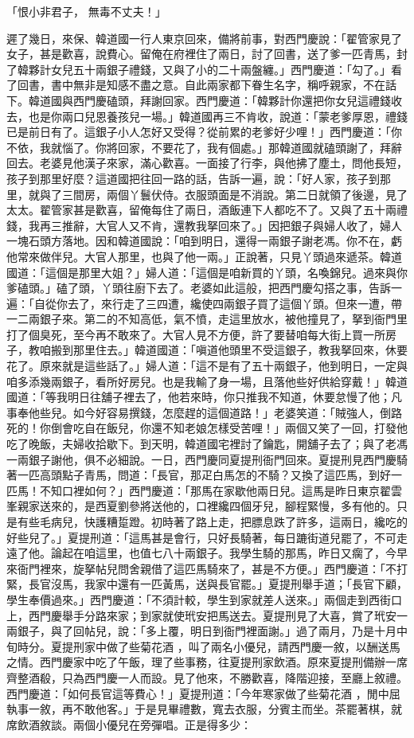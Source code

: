 \begin{showcontents}{}
「恨小非君子，  無毒不丈夫！」

遲了幾日，來保、韓道國一行人東京回來，備將前事，對西門慶說：「翟管家見了女子，甚是歡喜，說費心。留俺在府裡住了兩日，討了回書，送了爹一匹青馬，封了韓夥計女兒五十兩銀子禮錢，又與了小的二十兩盤纏。」西門慶道：「勾了。」看了回書，書中無非是知感不盡之意。自此兩家都下眷生名字，稱呼親家，不在話下。韓道國與西門慶磕頭，拜謝回家。西門慶道：「韓夥計你還把你女兒這禮錢收去，也是你兩口兒恩養孩兒一場。」韓道國再三不肯收，說道：「蒙老爹厚恩，禮錢已是前日有了。這銀子小人怎好又受得？從前累的老爹好少哩！」西門慶道：「你不依，我就惱了。你將回家，不要花了，我有個處。」那韓道國就磕頭謝了，拜辭回去。老婆見他漢子來家，滿心歡喜。一面接了行李，與他拂了塵土，問他長短，孩子到那里好麼？這道國把往回一路的話，告訴一遍，說：「好人家，孩子到那里，就與了三間房，兩個丫鬟伏侍。衣服頭面是不消說。第二日就領了後邊，見了太太。翟管家甚是歡喜，留俺每住了兩日，酒飯連下人都吃不了。又與了五十兩禮錢，我再三推辭，大官人又不肯，還教我拏回來了。」因把銀子與婦人收了，婦人一塊石頭方落地。因和韓道國說：「咱到明日，還得一兩銀子謝老馮。你不在，虧他常來做伴兒。大官人那里，也與了他一兩。」正說著，只見丫頭過來遞茶。韓道國道：「這個是那里大姐？」婦人道：「這個是咱新買的丫頭，名喚錦兒。過來與你爹磕頭。」磕了頭，丫頭往廚下去了。老婆如此這般，把西門慶勾搭之事，告訴一遍：「自從你去了，來行走了三四遭，纔使四兩銀子買了這個丫頭。但來一遭，帶一二兩銀子來。第二的不知高低，氣不憤，走這里放水，被他撞見了，拏到衙門里打了個臭死，至今再不敢來了。大官人見不方便，許了要替咱每大街上買一所房子，教咱搬到那里住去。」韓道國道：「嗔道他頭里不受這銀子，教我拏回來，休要花了。原來就是這些話了。」婦人道：「這不是有了五十兩銀子，他到明日，一定與咱多添幾兩銀子，看所好房兒。也是我輸了身一場，且落他些好供給穿戴！」韓道國道：「等我明日往舖子裡去了，他若來時，你只推我不知道，休要怠慢了他；凡事奉他些兒。如今好容易撰錢，怎麼趕的這個道路！」老婆笑道：「賊強人，倒路死的！你倒會吃自在飯兒，你還不知老娘怎樣受苦哩！」兩個又笑了一回，打發他吃了晚飯，夫婦收拾歇下。到天明，韓道國宅裡討了鑰匙，開舖子去了；與了老馮一兩銀子謝他，俱不必細說。一日，西門慶同夏提刑衙門回來。夏提刑見西門慶騎著一匹高頭點子青馬，問道：「長官，那疋白馬怎的不騎？又換了這匹馬，到好一匹馬！不知口裡如何？」西門慶道：「那馬在家歇他兩日兒。這馬是昨日東京翟雲峯親家送來的，是西夏劉參將送他的，口裡纔四個牙兒，腳程緊慢，多有他的。只是有些毛病兒，快護糟踅蹬。初時著了路上走，把膘息跌了許多，這兩日，纔吃的好些兒了。」夏提刑道：「這馬甚是會行，只好長騎著，每日蹗街道兒罷了，不可走遠了他。論起在咱這里，也值七八十兩銀子。我學生騎的那馬，昨日又瘸了，今早來衙門裡來，旋拏帖兒問舍親借了這匹馬騎來了，甚是不方便。」西門慶道：「不打緊，長官沒馬，我家中還有一匹黃馬，送與長官罷。」夏提刑舉手道；「長官下顧，學生奉價過來。」西門慶道：「不須計較，學生到家就差人送來。」兩個走到西街口上，西門慶舉手分路來家；到家就使玳安把馬送去。夏提刑見了大喜，賞了玳安一兩銀子，與了回帖兒，說：「多上覆，明日到衙門裡面謝。」過了兩月，乃是十月中旬時分。夏提刑家中做了些菊花酒 ，叫了兩名小優兒，請西門慶一敘，以酬送馬之情。西門慶家中吃了午飯，理了些事務，往夏提刑家飲酒。原來夏提刑備辦一席齊整酒殽，只為西門慶一人而設。見了他來，不勝歡喜，降階迎接，至廳上敘禮。西門慶道：「如何長官這等費心！」夏提刑道：「今年寒家做了些菊花酒 ，閒中屈執事一敘，再不敢他客。」于是見畢禮數，寬去衣服，分賓主而坐。茶罷著棋，就席飲酒敘談。兩個小優兒在旁彈唱。正是得多少：


\end{showcontents}
